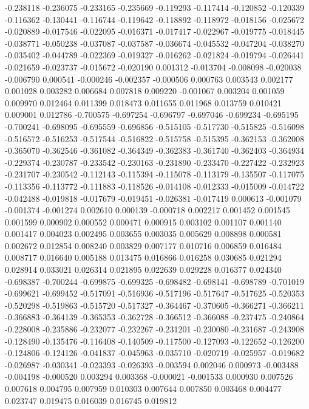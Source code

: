 -0.238118
-0.236075
-0.233165
-0.235669
-0.119293
-0.117414
-0.120852
-0.120339
-0.116362
-0.130441
-0.116744
-0.119642
-0.118892
-0.118972
-0.018156
-0.025672
-0.020889
-0.017546
-0.022095
-0.016371
-0.017417
-0.022967
-0.019775
-0.018445
-0.038771
-0.050238
-0.037087
-0.037587
-0.036674
-0.045532
-0.047204
-0.038270
-0.035402
-0.044789
-0.022369
-0.019327
-0.016262
-0.021824
-0.019794
-0.026441
-0.021659
-0.023737
-0.015672
-0.020190
0.001312
-0.013704
-0.008098
-0.020038
-0.006790
0.000541
-0.000246
-0.002357
-0.000506
0.000763
0.003543
0.002177
0.001028
0.003282
0.006684
0.007818
0.009220
-0.001067
0.003204
0.001059
0.009970
0.012464
0.011399
0.018473
0.011655
0.011968
0.013759
0.010421
0.009001
0.012786
-0.700575
-0.697254
-0.696797
-0.697046
-0.699234
-0.695195
-0.700241
-0.698095
-0.695559
-0.696856
-0.515105
-0.517730
-0.515825
-0.516098
-0.516572
-0.516253
-0.517544
-0.516822
-0.515758
-0.515395
-0.362153
-0.362008
-0.365070
-0.362546
-0.361082
-0.364349
-0.362383
-0.361740
-0.362403
-0.364934
-0.229374
-0.230787
-0.233542
-0.230163
-0.231890
-0.233470
-0.227422
-0.232923
-0.231707
-0.230542
-0.112143
-0.115394
-0.115078
-0.113179
-0.135507
-0.117075
-0.113356
-0.113772
-0.111883
-0.118526
-0.014108
-0.012333
-0.015009
-0.014722
-0.042488
-0.019818
-0.017679
-0.019451
-0.026381
-0.017419
0.000613
-0.001079
-0.001374
-0.001274
0.002610
0.000139
-0.000718
0.002217
0.001452
0.001545
0.001599
0.000902
0.000552
0.000471
0.000915
0.003102
0.001107
0.001140
0.001417
0.004023
0.002495
0.003655
0.003035
0.005629
0.008898
0.000581
0.002672
0.012854
0.008240
0.003829
0.007177
0.010716
0.006859
0.016484
0.008717
0.016640
0.005188
0.013475
0.016866
0.016258
0.030685
0.021294
0.028914
0.033021
0.026314
0.021895
0.022639
0.029228
0.016377
0.024340
-0.698387
-0.700244
-0.699875
-0.699325
-0.698482
-0.698141
-0.698789
-0.701019
-0.699621
-0.699452
-0.517091
-0.516936
-0.517196
-0.517647
-0.517625
-0.520353
-0.520298
-0.519863
-0.515720
-0.517327
-0.364467
-0.370605
-0.366271
-0.366211
-0.366883
-0.364139
-0.365353
-0.362728
-0.366512
-0.366088
-0.237475
-0.240864
-0.228008
-0.235886
-0.232077
-0.232267
-0.231201
-0.230080
-0.231687
-0.243908
-0.128490
-0.135476
-0.116408
-0.140509
-0.117500
-0.127093
-0.122652
-0.126200
-0.124806
-0.124126
-0.041837
-0.045963
-0.035710
-0.020719
-0.025957
-0.019682
-0.026987
-0.030341
-0.023393
-0.026393
-0.003594
0.002046
0.000973
-0.003488
-0.004198
-0.000520
0.003294
0.003368
-0.000021
-0.001533
0.000930
0.007526
0.007618
0.004795
0.007959
0.010303
0.007644
0.007850
0.003468
0.004477
0.023747
0.019475
0.016039
0.016745
0.019812
